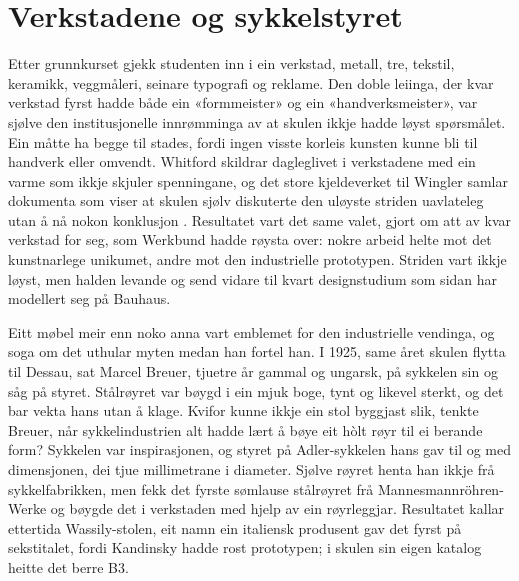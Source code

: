 \section{Verkstadene og sykkelstyret}

Etter grunnkurset gjekk studenten inn i ein verkstad, metall, tre, tekstil, keramikk, veggmåleri, seinare typografi og reklame. Den doble leiinga, der kvar verkstad fyrst hadde både ein «formmeister» og ein «handverksmeister», var sjølve den institusjonelle innrømminga av at skulen ikkje hadde løyst spørsmålet. Ein måtte ha begge til stades, fordi ingen visste korleis kunsten kunne bli til handverk eller omvendt. Whitford skildrar dagleglivet i verkstadene med ein varme som ikkje skjuler spenningane, og det store kjeldeverket til Wingler samlar dokumenta som viser at skulen sjølv diskuterte den uløyste striden uavlateleg utan å nå nokon konklusjon \autocite{whitford1984bauhaus,wingler1969bauhaus}. Resultatet vart det same valet, gjort om att av kvar verkstad for seg, som Werkbund hadde røysta over: nokre arbeid helte mot det kunstnarlege unikumet, andre mot den industrielle prototypen. Striden vart ikkje løyst, men halden levande og send vidare til kvart designstudium som sidan har modellert seg på Bauhaus.

Eitt møbel meir enn noko anna vart emblemet for den industrielle vendinga, og soga om det uthular myten medan han fortel han. I 1925, same året skulen flytta til Dessau, sat Marcel Breuer, tjuetre år gammal og ungarsk, på sykkelen sin og såg på styret. Stålrøyret var bøygd i ein mjuk boge, tynt og likevel sterkt, og det bar vekta hans utan å klage. Kvifor kunne ikkje ein stol byggjast slik, tenkte Breuer, når sykkelindustrien alt hadde lært å bøye eit hòlt røyr til ei berande form? Sykkelen var inspirasjonen, og styret på Adler-sykkelen hans gav til og med dimensjonen, dei tjue millimetrane i diameter. Sjølve røyret henta han ikkje frå sykkelfabrikken, men fekk det fyrste sømlause stålrøyret frå Mannesmannröhren-Werke og bøygde det i verkstaden med hjelp av ein røyrleggjar. Resultatet kallar ettertida Wassily-stolen, eit namn ein italiensk produsent gav det fyrst på sekstitalet, fordi Kandinsky hadde rost prototypen; i skulen sin eigen katalog heitte det berre B3.

